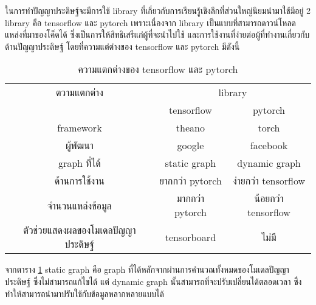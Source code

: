 ในการทำปัญญาประดิษฐ์จะมีการใช้ library ที่เกี่ยวกับการเรียนรู้เชิงลึกที่ส่วนใหญ่นิยมนำมาใช้มีอยู่ 2 library  คือ tensorflow และ pytorch เพราะเนื่องจาก library เป็นแบบที่สามารถดาวน์โหลดแหล่งที่มาของโค็ดได้ ซึ่งเป็นการให้สิทธิเสรีแก่ผู้ที่จะนำไปใช้ และการใช้งานที่ง่ายต่อผู้ที่ทำงานเกี่ยวกับด้านปัญญาประดิษฐ์ โดยที่ความแต่ต่างของ tensorflow และ pytorch มีดังนี้

\begin{table}[!ht]
	\centering
	\begin{tabular}{|c|c|c|}
		\hline
		{ตวามแตกต่าง}&\multicolumn{2}{c|}{library}\\
		\cline{2-3}
		{}								& tensorflow					& pytorch				\\
		\hline
		framework							& theano						& torch				\\
		\hline
		ผู้พัฒนา							& google						& facebook			\\
		\hline
		graph ที่ได้							& static graph					& dynamic graph		\\
		\hline
		ด้านการใช้งาน						& ยากกว่า pytorch				& ง่ายกว่า tensorflow		\\
		\hline
		จำนวนแหล่งข้อมูล					& มากกว่า pytorch				& น้อยกว่า tensorflow		\\
		\hline
		ตัวช่วยแสดงผลของโมเดลปัญญาประดิษฐ์		& tensorboard					& ไม่มี				\\
		\hline
	\end{tabular}
	\caption{ความแตกต่างของ tensorflow และ pytorch}
	\label{tab: ความแตกต่างของ tensorflow และ pytorch}
\end{table}

จากตาราง \ref{tab: ความแตกต่างของ tensorflow และ pytorch}  static graph คือ graph ที่ได้หลักจากผ่านการคำนวณทั้งหมดของโมเดลปัญญาประดิษฐ์ ซึ่งไม่สามารถแก้ไขได้ แต่ dynamic graph นั้นสามารถที่จะปรับเปลี่ยนได้ตลอดเวลา ซึ่งทำให้สามารถนำมาปรับใช้กับข้อมูลหลากหลายแบบได้
